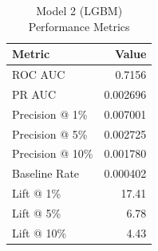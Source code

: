 \begin{table}[h]
\centering
\begin{tabular}{lr}
\toprule
Metric & Value \\
\midrule
ROC AUC & 0.7156 \\
PR AUC & 0.002696 \\
Precision @ 1\% & 0.007001 \\
Precision @ 5\% & 0.002725 \\
Precision @ 10\% & 0.001780 \\
Baseline Rate & 0.000402 \\
Lift @ 1\% & 17.41 \\
Lift @ 5\% & 6.78 \\
Lift @ 10\% & 4.43 \\
\bottomrule
\end{tabular}
\caption{Model 2 (LGBM) Performance Metrics}
\label{tab:model2_lgbm_metrics}
\end{table}
